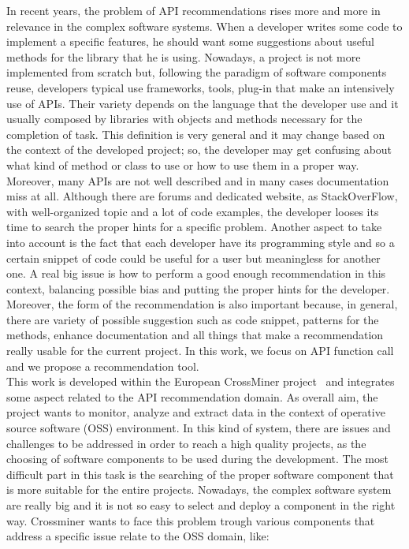 

In recent years, the problem of API recommendations rises more and more in relevance in the complex software systems. When a developer writes some code to implement a specific features, he should want some suggestions about useful methods for the library that he is using. Nowadays, a project is not more implemented from scratch but, following the paradigm of software components reuse, developers typical use frameworks, tools, plug-in that make an intensively use of APIs. Their variety depends on the language that the developer use and it usually composed by libraries with objects and methods necessary for the completion of task. This definition is very general and it may change based on the context of the developed project; so, the developer may get confusing about what kind of method or class to use or how to use them in a proper way. Moreover, many APIs are not well described and in many cases documentation miss at all. Although there are forums and dedicated website, as StackOverFlow, with well-organized topic and a lot of code examples, the developer looses its time to search the proper hints for a specific problem. Another aspect to take into account is the fact that each developer have its programming style and so a certain snippet of code could be useful for a user but meaningless for another one. 
\newline
A real big issue is how to perform a good enough recommendation in this context, balancing possible bias and putting the proper hints for the developer. Moreover, the form of the recommendation is also important because, in general, there are variety of possible suggestion such as code snippet, patterns for the methods, enhance documentation and all things that make a recommendation really usable for the current project. In this work, we focus on API function call and we propose a recommendation tool.\\
This work is developed within the European CrossMiner project~\cite{https://www.crossminer.org/_nodate} and integrates some aspect related to the API recommendation domain. As overall aim, the project wants to monitor, analyze and extract data in the context of operative source software (OSS) environment. In this kind of system, there are issues and challenges to be addressed in order to reach a high quality projects, as the choosing of software components to be used during the development. The most difficult part in this task is the searching of the proper software component that is more suitable for the entire projects. Nowadays, the complex software system are really big and it is not so easy to select and deploy a component in the right way. Crossminer wants to face this problem trough various components that address a specific issue relate to the OSS domain, like:
